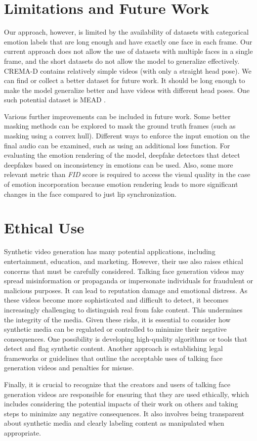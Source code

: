 \documentclass[accepted]{uai2023}
\begin{document}
\section{Limitations and Future Work}
Our approach, however, is limited by the availability of datasets with categorical emotion labels that are long enough and have exactly one face in each frame. Our current approach does not allow the use of datasets with multiple faces in a single frame, and the short datasets do not allow the model to generalize effectively. CREMA-D \citep{cao2014crema} contains relatively simple videos (with only a straight head pose). We can find or collect a better dataset for future work. It should be long enough to make the model generalize better and have videos with different head poses. One such potential dataset is MEAD \citep{wang2020mead}.

Various further improvements can be included in future work.
Some better masking methods can be explored to mask the ground truth frames (such as masking using a convex hull). Different ways to enforce the input emotion on the final audio can be examined, such as using an additional loss function. For evaluating the emotion rendering of the model, deepfake detectors that detect deepfakes based on inconsistency in emotions can be used. Also, some more relevant metric than \emph{FID} score is required to access the visual quality in the case of emotion incorporation because emotion rendering leads to more significant changes in the face compared to just lip synchronization. 

\section{Ethical Use}
Synthetic video generation has many potential applications, including entertainment, education, and marketing. However, their use also raises ethical concerns that must be carefully considered. Talking face generation videos may spread misinformation or propaganda or impersonate individuals for fraudulent or malicious purposes. It can lead to reputation damage and emotional distress. As these videos become more sophisticated and difficult to detect, it becomes increasingly challenging to distinguish real from fake content. This undermines the integrity of the media. Given these risks, it is essential to consider how synthetic media can be regulated or controlled to minimize their negative consequences. One possibility is developing high-quality algorithms or tools that detect and flag synthetic content. Another approach is establishing legal frameworks or guidelines that outline the acceptable uses of talking face generation videos and penalties for misuse. 

Finally, it is crucial to recognize that the creators and users of talking face generation videos are responsible for ensuring that they are used ethically, which includes considering the potential impacts of their work on others and taking steps to minimize any negative consequences. It also involves being transparent about synthetic media and clearly labeling content as manipulated when appropriate.
\end{document}
